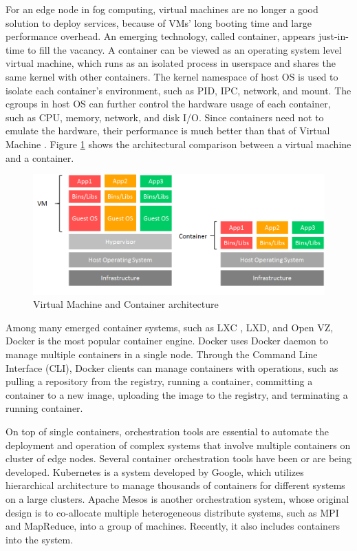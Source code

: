 For an edge node in fog computing, virtual machines are no longer a good solution to deploy services, because of VMs' long booting time and large performance overhead.  An emerging technology, called container, appears just-in-time to fill the vacancy.  A container \cite{soltesz2007container} can be viewed as an operating system level virtual machine, which runs as an isolated process in userspace and shares the same kernel with other containers.  The kernel namespace \cite{biederman2006multiple} of host OS is used to isolate each container's environment, such as PID, IPC, network, and mount.  The cgroups in host OS can further control the hardware usage of each container, such as CPU, memory, network, and disk I/O.  Since containers need not to emulate the hardware, their performance is much better than that of Virtual Machine \cite{xavier2013performance, dua2014virtualization, joy2015performance}.  Figure \ref{fig:VM_vs_container} shows the architectural comparison between a virtual machine and a container.

\begin{figure}[h]
\begin{center}
\includegraphics[width=15cm]{figure/VM_vs_container.png}
\end{center}
\caption{Virtual Machine and Container architecture}
\label{fig:VM_vs_container}
\end{figure}

Among many emerged container systems, such as LXC \cite{helsley2009lxc}, LXD, and Open VZ, Docker \cite{merkel2014docker} is the most popular container engine.  Docker uses Docker daemon to manage multiple containers in a single node.  Through the Command Line Interface (CLI), Docker clients can manage containers with operations, such as pulling a repository from the registry, running a container, committing a container to a new image, uploading the image to the registry, and terminating a running container.

On top of single containers, orchestration tools are essential to automate the deployment and operation of complex systems that involve multiple containers on cluster of edge nodes.  Several container orchestration tools have been or are being developed.  Kubernetes {\color{red} \cite{bernstein2014containers}} is a system developed by Google, which utilizes hierarchical architecture to manage thousands of containers for different systems on a large clusters. Apache Mesos {\color{red} \cite{hindman2011mesos}} is another orchestration system, whose original design is to co-allocate multiple heterogeneous distribute systems, such as MPI and MapReduce, into a group of machines.  Recently, it also includes containers into the system.

